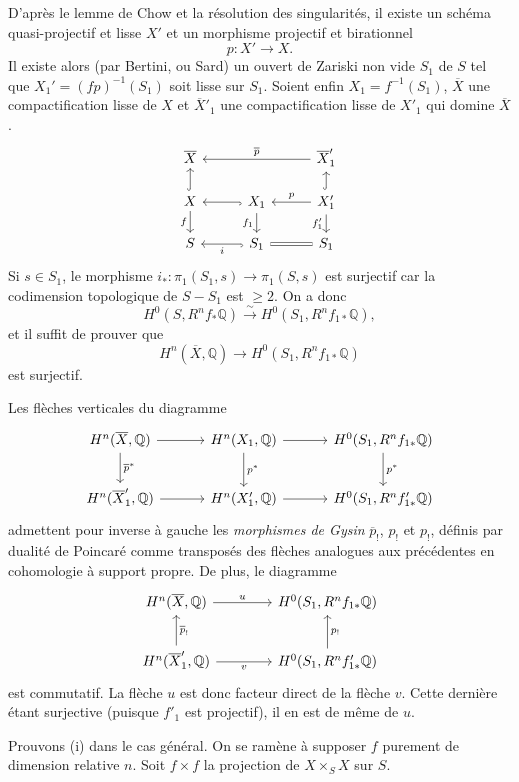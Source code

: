 \documentclass[10pt]{article}
\newcommand{\Q}{\mathbb Q}
\begin{document}
D'après le lemme de Chow et la résolution des singularités, il existe un schéma
quasi-projectif et lisse $X'$ et un morphisme projectif et birationnel
\[
p:X'\longrightarrow X.
\]
Il existe alors (par Bertini, ou Sard) un ouvert de Zariski non vide $S_1$ de $S$ tel que $X_1'=(fp)^{-1}(S_1)$ soit lisse sur $S_1$. Soient enfin $X_1=f^{-1}(S_1)$, $\overline X$ une compactification lisse de $X$ et $\overline X'_1$ une compactification lisse de $X'_1$ qui domine $\overline X$.
\[
\begin{tikzcd}[row sep=1.35em,column sep=2.8em]
\overline X && \overline X'_1 \arrow[ll,"\overline p"']\\
X \arrow[u,hook] \arrow[d,"f"'] & X_1 \arrow[l,hook] \arrow[d,"f_1"'] & X'_1 \arrow[l,"p"'] \arrow[u,hook] \arrow[d,"f'_1"']\\
S & S_1 \arrow[l,hook,"i"] & S_1 \arrow[l,equal]
\end{tikzcd}
\]
Si $s\in S_1$, le morphisme $i_*:\pi_1(S_1,s)\to\pi_1(S,s)$ est surjectif car la codimension topologique de $S-S_1$ est $\ge2$. On a donc
\[
H^0(S,R^nf_*\Q)\xrightarrow{\sim} H^0(S_1,R^nf_{1*}\Q),
\]
et il suffit de prouver que
\[
H^n(\overline X,\Q)\longrightarrow H^0(S_1,R^nf_{1*}\Q)
\]
est surjectif.

Les flèches verticales du diagramme
\[
\begin{tikzcd}[column sep=3.2em,row sep=2.2em]
H^n(\overline X,\Q) \arrow[r] \arrow[d,"\overline p^*"] &
H^n(X_1,\Q) \arrow[r] \arrow[d,"p^*"] &
H^0(S_1,R^nf_{1*}\Q) \arrow[d,"p^*"]\\
H^n(\overline X'_1,\Q) \arrow[r] &
H^n(X'_1,\Q) \arrow[r] &
H^0(S_1,R^nf'_{1*}\Q)
\end{tikzcd}
\]
admettent pour inverse à gauche les \emph{morphismes de Gysin} $\overline p_!$, $p_!$ et $p_!$, définis par dualité de Poincaré comme transposés des flèches analogues aux précédentes en cohomologie à support propre. De plus, le diagramme
\[
\begin{tikzcd}[column sep=4em,row sep=2.2em]
H^n(\overline X,\Q) \arrow[r,"u"] &
H^0(S_1,R^nf_{1*}\Q)\\
H^n(\overline X'_1,\Q) \arrow[u,"\overline p_!"'] \arrow[r,"v"'] &
H^0(S_1,R^nf'_{1*}\Q) \arrow[u,"p_!"']
\end{tikzcd}
\]
est commutatif. La flèche $u$ est donc facteur direct de la flèche $v$. Cette dernière étant surjective (puisque $f'_1$ est projectif), il en est de même de $u$.

Prouvons (i) dans le cas général. On se ramène à supposer $f$ purement de dimension relative $n$. Soit $f\times f$ la projection de $X\times_SX$ sur $S$.
\end{document}
